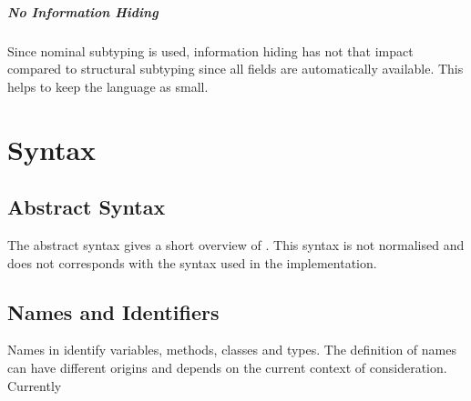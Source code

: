 \paragraph{No Information Hiding}
Since nominal subtyping is used, information hiding has not that impact
compared to structural subtyping since all fields are automatically
available. This helps to keep the language as small.

\chapter{Syntax}

\section{Abstract Syntax}
The abstract syntax gives a short overview of \ooplss. This syntax is
not normalised and does not corresponds with the syntax used in the
implementation.


\section{Names and Identifiers}
Names in \ooplss identify variables, methods, classes and types. The definition of names can have different origins and depends on the current context of consideration. Currently 

